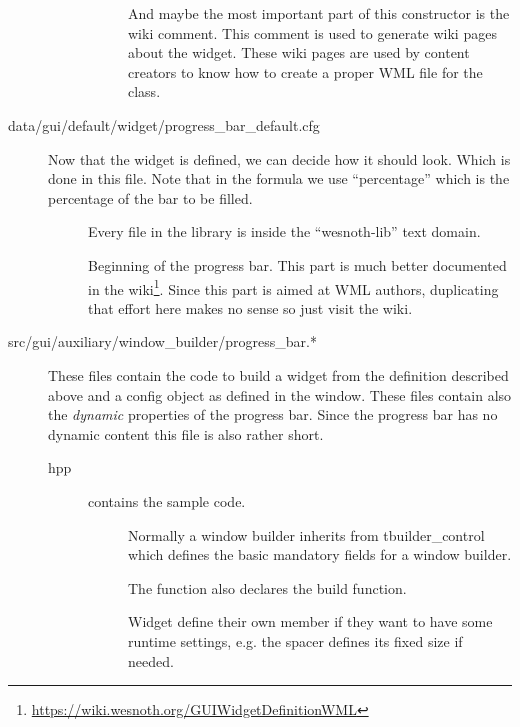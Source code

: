 \begin{description}
\begin{description}
\begin{description}
		And maybe the most important part of this constructor is the wiki
		comment. This comment is used to generate wiki pages about the widget.
		These wiki pages are used by content creators to know how to create a
		proper WML file for the class.
	\end{description}
\end{description}

\item[data/gui/default/widget/progress\_bar\_default.cfg]
	Now that the widget is defined, we can decide how it should look. Which is
	done in this file. Note that in the formula we use ``percentage'' which is
	the percentage of the bar to be filled.

	\begin{description}
	\item[] Every file in the library
		is inside the ``wesnoth-lib'' text domain.

	\item[]
		Beginning of the progress bar. This part is much better documented in
		the wiki\footnote{\url{https://wiki.wesnoth.org/GUIWidgetDefinitionWML}}.
		Since this part is aimed at WML authors, duplicating that effort here
		makes no sense so just visit the wiki.

	\end{description}

\item[src/gui/auxiliary/window\_builder/progress\_bar.*]
	These files contain the code to build a widget from the definition described
	above and a config object as defined in the window. These files contain also the
	\emph{dynamic} properties of the progress bar. Since the progress bar has no
	dynamic content this file is also rather short.

\begin{description}
\item[hpp]  contains the sample code.
	\begin{description}
	\item[] Normally a
		window builder inherits from tbuilder\_control which defines the
		basic mandatory fields for a window builder.

		The function also declares the build function.

		Widget define their own member if they want to have some runtime
		settings, e.g. the spacer defines its fixed size if needed.
	\end{description}


\end{description}
\end{description}

